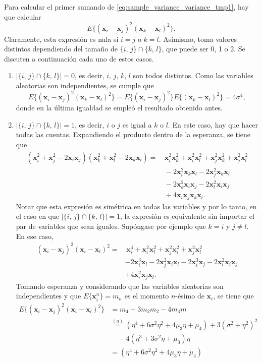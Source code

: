 \documentclass[a4paper]{report}
\newcommand{\x}{\mathbf{x}}
\begin{document}
Para calcular el primer sumando de \ref{eq:sample_variance_variance_tmp1}, hay que calcular
\[
 E\{(\x_i-\x_j)^2(\x_k-\x_l)^2\}.
\] 
Claramente, esta expresión es nula si \(i=j\) o \(k=l\). Asimismo, toma valores distintos dependiendo del tamaño de \(\{i,\,j\}\cap\{k,\,l\}\), que puede ser 0, 1 o 2. Se discuten a continuación cada uno de estos casos.
\begin{enumerate}
 \item \(|\{i,\,j\}\cap\{k,\,l\}|=0\), es decir, \(i,\,j,\,k,\,l\) son todos distintos. Como las variables aleatorias son independientes, se cumple que
 \[
  E\{(\x_i-\x_j)^2(\x_k-\x_l)^2\}=E\{(\x_i-\x_j)^2\}E\{(\x_k-\x_l)^2\}=4\sigma^4,
 \]
donde en la última igualdad se empleó el resultado obtenido antes.
 \item \(|\{i,\,j\}\cap\{k,\,l\}|=1\), es decir, \(i\) o \(j\) es igual a \(k\) o \(l\). En este caso, hay que hacer todas las cuentas. Expandiendo el producto dentro de la esperanza, se tiene que
 \begin{align*}
  (\x_i^2+\x_j^2-2\x_i\x_j)(\x_k^2+\x_l^2-2\x_k\x_l)=&\,\x_i^2\x_k^2+\x_i^2\x_l^2+\x_j^2\x_k^2+\x_j^2\x_l^2\\
    &\,-2\x_i^2\x_k\x_l-2\x_j^2\x_k\x_l\\
    &\,-2\x_k^2\x_i\x_j-2\x_l^2\x_i\x_j\\
    &\,+4\x_i\x_j\x_k\x_l.
 \end{align*}
 Notar que esta expresión es simétrica en todas las variables y por lo tanto, en el caso en que \(|\{i,\,j\}\cap\{k,\,l\}|=1\), la expresión es equivalente sin importar el par de variables que sean iguales. Supóngase por ejemplo que \(k=i\) y \(j\neq l\). En ese caso,
 \begin{align*}
  (\x_i-\x_j)^2(\x_i-\x_l)^2=&\,\x_i^4+\x_i^2\x_l^2+\x_j^2\x_i^2+\x_j^2\x_l^2\\
    &-2\x_i^3\x_l-2\x_j^2\x_i\x_l-2\x_i^3\x_j-2\x_l^2\x_i\x_j\\
    &+4\x_i^2\x_j\x_l.
 \end{align*}
 Tomando esperanza y considerando que las variables aleatorias son independientes y que \(E\{\x_i^n\}=m_n\) es el momento \(n\)-ésimo de \(\x_i\), se tiene que
 \begin{align*}
  E\{(\x_i-\x_j)^2(\x_i-\x_l)^2\}&=m_4+3m_2m_2-4m_3m\\
   &\overset{(a)}{=}(\eta^4+6\sigma^2\eta^2+4\mu_3\eta+\mu_4)+3(\sigma^2+\eta^2)^2\\
   &\quad-4(\eta^3+3\sigma^2\eta+\mu_3)\eta\\
   &=(\eta^4+6\sigma^2\eta^2+4\mu_3\eta+\mu_4)\\

\end{align*}
\end{enumerate}
\end{document}
